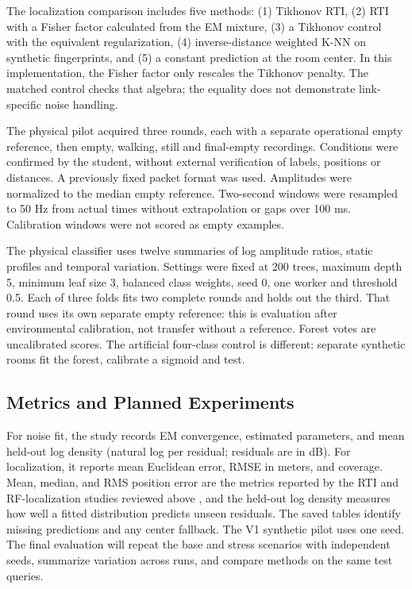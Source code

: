 \documentclass[sensors,article,submit,oneauthor]{Definitions/mdpi}
\begin{document}
The localization comparison includes five methods: (1) Tikhonov RTI, (2) RTI with a Fisher factor calculated from the EM mixture, (3) a Tikhonov control with the equivalent regularization, (4) inverse-distance weighted K-NN on synthetic fingerprints, and (5) a constant prediction at the room center. In this implementation, the Fisher factor only rescales the Tikhonov penalty. The matched control checks that algebra; the equality does not demonstrate link-specific noise handling.

The physical pilot acquired three rounds, each with a separate operational empty reference, then empty, walking, still and final-empty recordings. Conditions were confirmed by the student, without external verification of labels, positions or distances. A previously fixed packet format was used. Amplitudes were normalized to the median empty reference. Two-second windows were resampled to 50 Hz from actual times without extrapolation or gaps over 100 ms. Calibration windows were not scored as empty examples.

The physical classifier uses twelve summaries of log amplitude ratios, static profiles and temporal variation. Settings were fixed at 200 trees, maximum depth 5, minimum leaf size 3, balanced class weights, seed 0, one worker and threshold 0.5. Each of three folds fits two complete rounds and holds out the third. That round uses its own separate empty reference: this is evaluation after environmental calibration, not transfer without a reference. Forest votes are uncalibrated scores. The artificial four-class control is different: separate synthetic rooms fit the forest, calibrate a sigmoid and test.

\subsection{Metrics and Planned Experiments}

For noise fit, the study records EM convergence, estimated parameters, and mean held-out log density (natural log per residual; residuals are in dB). For localization, it reports mean Euclidean error, RMSE in meters, and coverage. Mean, median, and RMS position error are the metrics reported by the RTI and RF-localization studies reviewed above \cite{Huang2020,Zhao2011,Kaltiokallio2021,Bahl2000}, and the held-out log density measures how well a fitted distribution predicts unseen residuals. The saved tables identify missing predictions and any center fallback. The V1 synthetic pilot uses one seed. The final evaluation will repeat the base and stress scenarios with independent seeds, summarize variation across runs, and compare methods on the same test queries.
\end{document}
